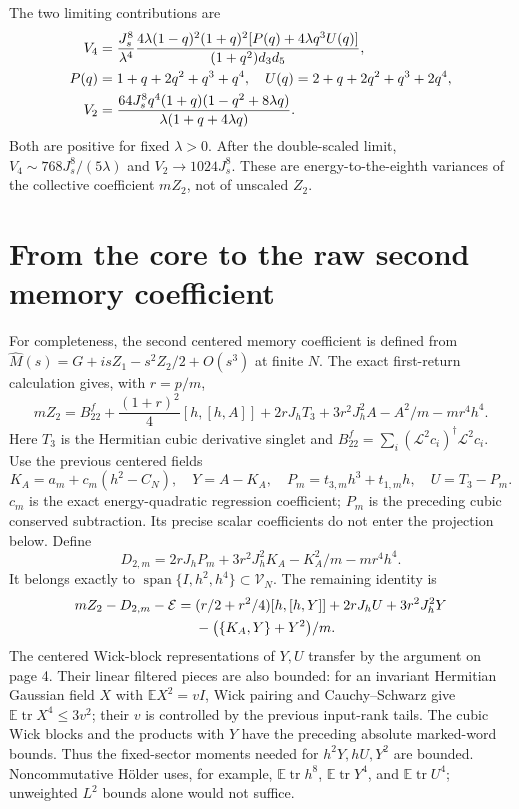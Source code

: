 \documentclass[11pt,a4paper]{article}
\newcommand{\EE}{\mathbb E}
\newcommand{\tr}{\operatorname{tr}}
\newcommand{\core}{\mathcal E}
\begin{document}
The two limiting contributions are
\begin{align}
 V_4&=\frac{J_s^8}{\lambda^4}
 \frac{4\lambda(1-q)^2(1+q)^2[P(q)+4\lambda q^3U(q)]}
 {(1+q^2)d_3d_5},\label{V4}\\
 P(q)&=1+q+2q^2+q^3+q^4,\quad
 U(q)=2+q+2q^2+q^3+2q^4,\notag\\
 V_2&=\frac{64J_s^8q^4(1+q)(1-q^2+8\lambda q)}
 {\lambda(1+q+4\lambda q)}.\label{V2}
\end{align}
Both are positive for fixed $\lambda>0$. After the double-scaled
limit, $V_4\sim768J_s^8/(5\lambda)$ and $V_2\to1024J_s^8$.
These are energy-to-the-eighth variances of the collective
coefficient $mZ_2$, not of unscaled $Z_2$.

\newpage
\section{From the core to the raw second memory coefficient}
For completeness, the second centered memory coefficient is defined
from $\widehat M(s)=G+isZ_1-s^2Z_2/2+O(s^3)$ at finite $N$.
The exact first-return calculation gives, with $r=p/m$,
\begin{equation}
 mZ_2=B_{22}^f+\frac{(1+r)^2}{4}[h,[h,A]]
       +2rJ_hT_3+3r^2J_h^2A-A^2/m-mr^4h^4.
\end{equation}
Here $T_3$ is the Hermitian cubic derivative singlet and
$B_{22}^f=\sum_i(\mathcal L^2c_i)^\dagger\mathcal L^2c_i$.
Use the previous centered fields
\begin{equation}
 K_A=a_m+c_m(h^2-C_N),\quad Y=A-K_A,\quad
 P_m=t_{3,m}h^3+t_{1,m}h,\quad U=T_3-P_m.
\end{equation}
$c_m$ is the exact energy-quadratic regression coefficient; $P_m$
is the preceding cubic conserved subtraction. Its precise scalar
coefficients do not enter the projection below. Define
\begin{equation}
 D_{2,m}=2rJ_hP_m+3r^2J_h^2K_A-K_A^2/m-mr^4h^4.
\end{equation}
It belongs exactly to $\operatorname{span}\{I,h^2,h^4\}\subset
\mathcal V_N$. The remaining identity is
\begin{align}
 mZ_2-D_{2,m}-\core={}&(r/2+r^2/4)[h,[h,Y]]
                       +2rJ_hU+3r^2J_h^2Y\notag\\
 &-\bigl(\{K_A,Y\}+Y^2\bigr)/m.\label{remainder}
\end{align}
The centered Wick-block representations of $Y,U$ transfer by the
argument on page 4. Their linear filtered pieces are also bounded:
for an invariant Hermitian Gaussian field $X$ with $\EE X^2=vI$,
Wick pairing and Cauchy--Schwarz give $\EE\tr X^4\leq3v^2$;
their $v$ is controlled by the previous input-rank tails. The
cubic Wick blocks and the products with $Y$ have the preceding
absolute marked-word bounds. Thus the fixed-sector moments needed
for $h^2Y,hU,Y^2$ are bounded. Noncommutative H\"older uses, for
example, $\EE\tr h^8$, $\EE\tr Y^4$, and $\EE\tr U^4$;
unweighted $L^2$ bounds alone would not suffice.
\end{document}
